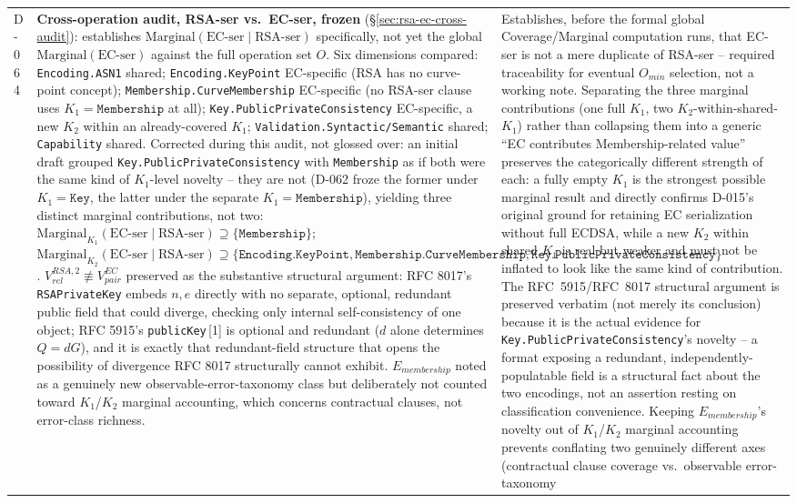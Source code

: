 \documentclass[11pt,a4paper]{article}
\begin{document}
\begin{longtable}{@{}L{0.28\textwidth}L{0.34\textwidth}L{0.30\textwidth}@{}}
D-064 & \textbf{Cross-operation audit, RSA-ser vs.\ EC-ser, frozen} (\S\ref{sec:rsa-ec-cross-audit}): establishes $\text{Marginal}(\text{EC-ser}\mid\text{RSA-ser})$ specifically, not yet the global $\text{Marginal}(\text{EC-ser})$ against the full operation set $O$. Six dimensions compared: \texttt{Encoding.ASN1} shared; \texttt{Encoding.KeyPoint} EC-specific (RSA has no curve-point concept); \texttt{Membership.CurveMembership} EC-specific (no RSA-ser clause uses $K_1=\texttt{Membership}$ at all); \texttt{Key.PublicPrivateConsistency} EC-specific, a new $K_2$ within an already-covered $K_1$; \texttt{Validation.Syntactic/Semantic} shared; \texttt{Capability} shared. Corrected during this audit, not glossed over: an initial draft grouped \texttt{Key.PublicPrivateConsistency} with \texttt{Membership} as if both were the same kind of $K_1$-level novelty -- they are not (D-062 froze the former under $K_1=\texttt{Key}$, the latter under the separate $K_1=\texttt{Membership}$), yielding three distinct marginal contributions, not two: $\text{Marginal}_{K_1}(\text{EC-ser}\mid\text{RSA-ser})\supseteq\{\texttt{Membership}\}$; $\text{Marginal}_{K_2}(\text{EC-ser}\mid\text{RSA-ser})\supseteq\{\texttt{Encoding.KeyPoint}, \texttt{Membership.CurveMembership}, \texttt{Key.PublicPrivateConsistency}\}$. $V_{rel}^{RSA,2}\not\equiv V_{pair}^{EC}$ preserved as the substantive structural argument: RFC 8017's \texttt{RSAPrivateKey} embeds $n,e$ directly with no separate, optional, redundant public field that could diverge, checking only internal self-consistency of one object; RFC 5915's \texttt{publicKey}\,[1] is optional and redundant ($d$ alone determines $Q=dG$), and it is exactly that redundant-field structure that opens the possibility of divergence RFC 8017 structurally cannot exhibit. $E_{membership}$ noted as a genuinely new observable-error-taxonomy class but deliberately not counted toward $K_1$/$K_2$ marginal accounting, which concerns contractual clauses, not error-class richness. & Establishes, before the formal global Coverage/Marginal computation runs, that EC-ser is not a mere duplicate of RSA-ser -- required traceability for eventual $O_{min}$ selection, not a working note. Separating the three marginal contributions (one full $K_1$, two $K_2$-within-shared-$K_1$) rather than collapsing them into a generic ``EC contributes Membership-related value'' preserves the categorically different strength of each: a fully empty $K_1$ is the strongest possible marginal result and directly confirms D-015's original ground for retaining EC serialization without full ECDSA, while a new $K_2$ within shared $K_1$ is real but weaker and must not be inflated to look like the same kind of contribution. The RFC~5915/RFC~8017 structural argument is preserved verbatim (not merely its conclusion) because it is the actual evidence for \texttt{Key.PublicPrivateConsistency}'s novelty -- a format exposing a redundant, independently-populatable field is a structural fact about the two encodings, not an assertion resting on classification convenience. Keeping $E_{membership}$'s novelty out of $K_1$/$K_2$ marginal accounting prevents conflating two genuinely different axes (contractual clause coverage vs.\ observable error-taxonomy 
\end{longtable}
\end{document}

